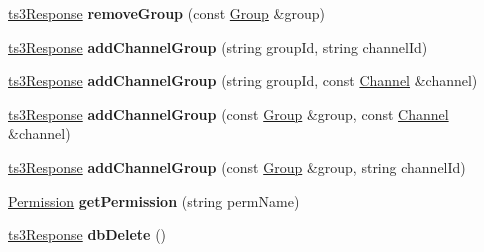 \begin{DoxyCompactItemize}
\item 
\hyperlink{struct_ts3_api_1_1ts3_response}{ts3\+Response} {\bfseries remove\+Group} (const \hyperlink{class_ts3_api_1_1_group}{Group} \&group)\hypertarget{class_ts3_api_1_1_client_a7bce985b603efcf0ff8962fcab3a5561}{}\label{class_ts3_api_1_1_client_a7bce985b603efcf0ff8962fcab3a5561}

\item 
\hyperlink{struct_ts3_api_1_1ts3_response}{ts3\+Response} {\bfseries add\+Channel\+Group} (string group\+Id, string channel\+Id)\hypertarget{class_ts3_api_1_1_client_ac98aa52e4c9a76e65f5786ce8197c712}{}\label{class_ts3_api_1_1_client_ac98aa52e4c9a76e65f5786ce8197c712}

\item 
\hyperlink{struct_ts3_api_1_1ts3_response}{ts3\+Response} {\bfseries add\+Channel\+Group} (string group\+Id, const \hyperlink{class_ts3_api_1_1_channel}{Channel} \&channel)\hypertarget{class_ts3_api_1_1_client_aa50ad14f4af3336dc852dd7d836db88f}{}\label{class_ts3_api_1_1_client_aa50ad14f4af3336dc852dd7d836db88f}

\item 
\hyperlink{struct_ts3_api_1_1ts3_response}{ts3\+Response} {\bfseries add\+Channel\+Group} (const \hyperlink{class_ts3_api_1_1_group}{Group} \&group, const \hyperlink{class_ts3_api_1_1_channel}{Channel} \&channel)\hypertarget{class_ts3_api_1_1_client_a4ebbfa0837f4c5d70d40fda76042178d}{}\label{class_ts3_api_1_1_client_a4ebbfa0837f4c5d70d40fda76042178d}

\item 
\hyperlink{struct_ts3_api_1_1ts3_response}{ts3\+Response} {\bfseries add\+Channel\+Group} (const \hyperlink{class_ts3_api_1_1_group}{Group} \&group, string channel\+Id)\hypertarget{class_ts3_api_1_1_client_ae504b68d7d3e8fe32b568e54868392b5}{}\label{class_ts3_api_1_1_client_ae504b68d7d3e8fe32b568e54868392b5}

\item 
\hyperlink{class_ts3_api_1_1_permission}{Permission} {\bfseries get\+Permission} (string perm\+Name)\hypertarget{class_ts3_api_1_1_client_a707da8b57b1d8cea387d740507878170}{}\label{class_ts3_api_1_1_client_a707da8b57b1d8cea387d740507878170}

\item 
\hyperlink{struct_ts3_api_1_1ts3_response}{ts3\+Response} {\bfseries db\+Delete} ()\hypertarget{class_ts3_api_1_1_client_a121f505bf3d9b852c22ee668d6734b3a}{}\label{class_ts3_api_1_1_client_a121f505bf3d9b852c22ee668d6734b3a}


\end{DoxyCompactItemize}
